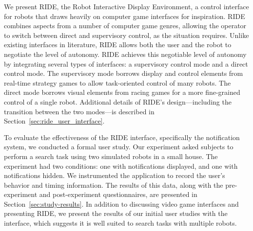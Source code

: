 



We present RIDE, the Robot Interactive Display Environment, a control interface for robots that draws heavily on computer game interfaces for inspiration. RIDE combines aspects from a number of computer game genres, allowing the operator to switch between direct and supervisory control, as the situation requires. Unlike existing interfaces in literature, RIDE allows both the user and the robot to negotiate the level of autonomy. RIDE achieves this negotiable level of autonomy by integrating several types of interfaces: a supervisory control mode and a direct control mode. The supervisory mode borrows display and control elements from real-time strategy games to allow task-oriented control of many robots. The direct mode borrows visual elements from racing games for a more fine-grained control of a single robot. Additional details of RIDE’s design—including the transition between the two modes—is described in Section~\ref{sec:ride_user_interface}.

To evaluate the effectiveness of the RIDE interface, specifically the notification system, we conducted a formal user study. Our experiment asked subjects to perform a search task using two simulated robots in a small house. The experiment had two conditions: one with notifications displayed, and one with notifications hidden. We instrumented the application to record the user’s behavior and timing information. The results of this data, along with the pre-experiment and post-experiment questionnaires, are presented in Section~\ref{sec:study-results}. In addition to discussing video game interfaces and presenting RIDE, we present the results of our initial user studies with the interface, which suggests it is well suited to search tasks with multiple robots.
